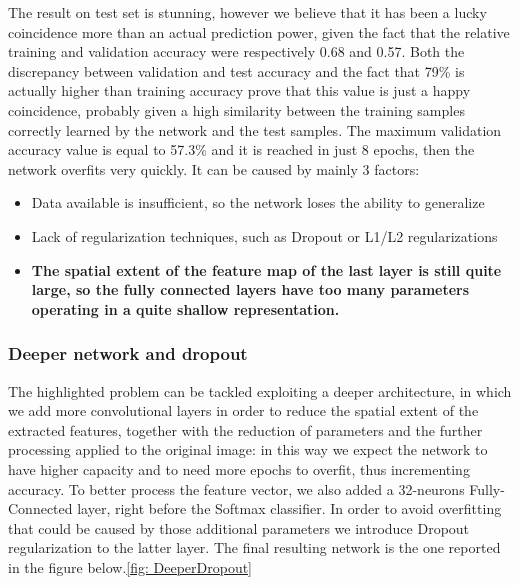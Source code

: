 \medskip

\noindent The result on test set is stunning, however we believe that it has been a lucky coincidence more than an actual prediction power, given the fact that the relative training and validation accuracy were respectively 0.68 and 0.57. Both the discrepancy between validation and test accuracy and the fact that 79\% is actually higher than training accuracy prove that this value is just a happy coincidence, probably given a high similarity between the training samples correctly learned by the network and the test samples. The maximum validation accuracy value is equal to 57.3\% and it is reached in just 8 epochs, then the network overfits very quickly. It can be caused by mainly 3 factors:
\begin{itemize}
\item Data available is insufficient, so the network loses the ability to generalize
\item Lack of regularization techniques, such as Dropout or L1/L2 regularizations
\item \textbf{The spatial extent of the feature map of the last layer is still quite large, so the fully connected layers have too many parameters operating in a quite shallow representation.} 
\end{itemize} 

\subsubsection{Deeper network and dropout}
The highlighted problem can be tackled exploiting a deeper architecture, in which we add more convolutional layers in order to reduce the spatial extent of the extracted features, together with the reduction of parameters and the further processing applied to the original image: in this way we expect the network to have higher capacity and to need more epochs to overfit, thus incrementing accuracy.
To better process the feature vector, we also added a 32-neurons Fully-Connected layer, right before the Softmax classifier. In order to avoid overfitting that could be caused by those additional parameters we introduce Dropout regularization to the latter layer.   
The final resulting network is the one reported in the figure below.\ref{fig: DeeperDropout}

